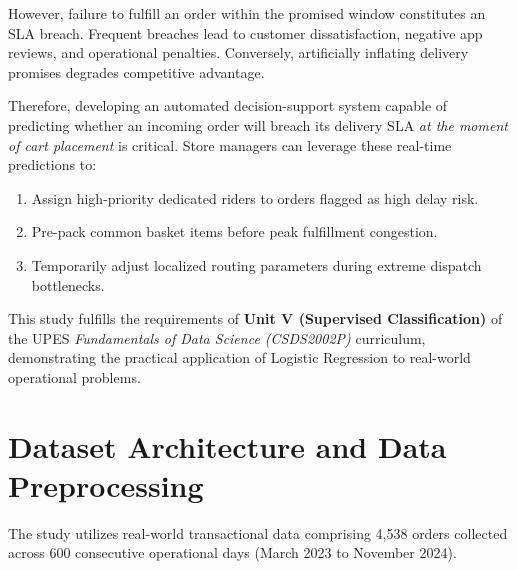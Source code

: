 \documentclass[11pt,a4paper]{article}
\begin{document}
However, failure to fulfill an order within the promised window constitutes an SLA breach. Frequent breaches lead to customer dissatisfaction, negative app reviews, and operational penalties. Conversely, artificially inflating delivery promises degrades competitive advantage. 

Therefore, developing an automated decision-support system capable of predicting whether an incoming order will breach its delivery SLA \textit{at the moment of cart placement} is critical. Store managers can leverage these real-time predictions to:
\begin{enumerate}
    \item Assign high-priority dedicated riders to orders flagged as high delay risk.
    \item Pre-pack common basket items before peak fulfillment congestion.
    \item Temporarily adjust localized routing parameters during extreme dispatch bottlenecks.
\end{enumerate}

This study fulfills the requirements of \textbf{Unit V (Supervised Classification)} of the UPES \textit{Fundamentals of Data Science (CSDS2002P)} curriculum, demonstrating the practical application of Logistic Regression to real-world operational problems.

\section{Dataset Architecture and Data Preprocessing}
\label{sec:data}
The study utilizes real-world transactional data comprising 4,538 orders collected across 600 consecutive operational days (March 2023 to November 2024).
\end{document}
